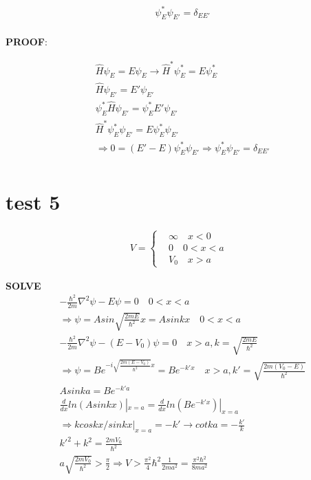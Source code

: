 \documentclass{article}
\begin{document}
\begin{align*}
  & \psi^*_E\psi_{E'}= \delta _{EE'} \\
\end{align*}

\textbf{PROOF}:

\begin{align*}
  & \hat H\psi_E=E\psi_E \rightarrow \hat H^* \psi^*_E=E\psi_E^* \\
  & \hat H\psi_{E'}=E'\psi_{E'} \\
  &\psi^*_E\hat H \psi_{E'}=\psi^*_EE'\psi_{E'} \\
  &\hat H^*\psi^*_E \psi_{E'}=E\psi^*_E\psi_{E'} \\
  &\Rightarrow 0=(E'-E)\psi^*_E\psi_{E'} \Rightarrow \psi^*_E\psi_{E'}= \delta _{EE'} \\
\end{align*}

\section{test 5}
\begin{align*}
 V=\begin{cases}
  & \infty\quad x<0\\
  &0\quad 0<x<a\\
  & V_0\quad x>a
 \end{cases}
\end{align*}

 \textbf{SOLVE}
 \begin{align*}
  & -\frac{\hbar^2}{2m}\nabla^2\psi-E\psi=0\quad 0<x<a  \\
  &\Rightarrow \psi = Asin\sqrt{\frac{2mE}{\hbar^2}}x=Asinkx \quad 0<x<a \\
  & -\frac{\hbar^2}{2m}\nabla^2\psi-(E-V_0)\psi=0 \quad x>a,k=\sqrt{\frac{2mE}{\hbar^2}} \\
  &\Rightarrow \psi=Be^{-i\sqrt{\frac{2m(E-V_0)}{\hbar^2}}x}=Be^{-k'x}\quad x>a,k'=\sqrt{\frac{2m(V_0-E)}{\hbar^2}} \\
  & Asinka=Be^{-k'a} \\
  & \frac{d}{dx}ln(Asinkx)|_{x=a}=\frac{d}{dx}ln(Be^{-k'x})|_{x=a} \\
  &\Rightarrow kcoskx/sinkx|_{x=a}=-k'\rightarrow cotka=-\frac{k'}k \\
  &k'^2+k^2=\frac{2mV_0}{\hbar^2} \\
  &a\sqrt{\frac{2mV_0}{\hbar^2}}>\frac{\pi}2 \Rightarrow V>\frac{\pi^2}4\hbar^2\frac1{2ma^2}=\frac{\pi^2\hbar^2}{8ma^2}\\
 \end{align*}
\end{document}
